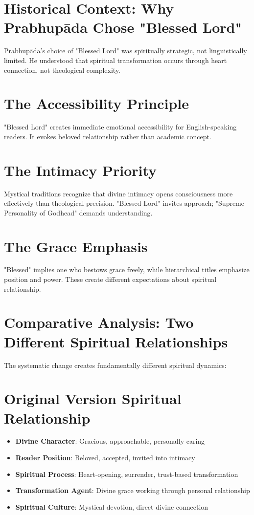 \documentclass[11pt,twoside]{book}
\begin{document}
\section*{Historical Context: Why Prabhupāda Chose "Blessed Lord"}
\label{sec:org7762a9f}

Prabhupāda's choice of "Blessed Lord" was spiritually strategic, not linguistically limited. He understood that spiritual transformation occurs through heart connection, not theological complexity.
\section*{The Accessibility Principle}
\label{sec:org64990ce}
"Blessed Lord" creates immediate emotional accessibility for English-speaking readers. It evokes beloved relationship rather than academic concept.
\section*{The Intimacy Priority}
\label{sec:org38b890f}
Mystical traditions recognize that divine intimacy opens consciousness more effectively than theological precision. "Blessed Lord" invites approach; "Supreme Personality of Godhead" demands understanding.
\section*{The Grace Emphasis}
\label{sec:org7d10b3a}
"Blessed" implies one who bestows grace freely, while hierarchical titles emphasize position and power. These create different expectations about spiritual relationship.
\section*{Comparative Analysis: Two Different Spiritual Relationships}
\label{sec:org0f06a80}

The systematic change creates fundamentally different spiritual dynamics:
\section*{Original Version Spiritual Relationship}
\label{sec:orgd7a410d}
\begin{itemize}
\item \textbf{\textbf{Divine Character}}: Gracious, approachable, personally caring
\item \textbf{\textbf{Reader Position}}: Beloved, accepted, invited into intimacy
\item \textbf{\textbf{Spiritual Process}}: Heart-opening, surrender, trust-based transformation
\item \textbf{\textbf{Transformation Agent}}: Divine grace working through personal relationship
\item \textbf{\textbf{Spiritual Culture}}: Mystical devotion, direct divine connection
\end{itemize}
\end{document}
